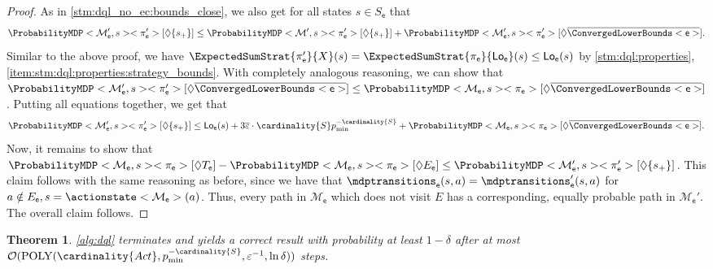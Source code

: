 \documentclass{article}
\newtheorem{theorem}{Theorem}\newtheorem{lemma}[theorem]{Lemma}\newtheorem{proposition}[theorem]{Proposition}\newtheorem{corollary}[theorem]{Corollary}\newtheorem{definition}[theorem]{Definition}\newtheorem{claim}[theorem]{Claim}\newtheorem{remark}[theorem]{Remark}\newtheorem{observation}[theorem]{Observation}\newtheorem{conjecture}[theorem]{Conjecture}\newtheorem{example}[theorem]{Example}
\newcommand{\MDP}{\mathcal{M}}
\newcommand{\States}{S}
\newcommand{\Actions}{Act}
\newcommand{\strategy}{\pi}
\newcommand{\reach}{\Diamond}
\newcommand{\lowerbound}{\mathsf{Lo}}
\newcommand{\targetstate}{s_+}
\newcommand{\targetset}{T}
\newcommand{\updatestep}{{\overline{\varepsilon}}}
\newcommand{\algoepisode}{\mathsf{e}}
\begin{document}
\begin{proof}
	As in \cref{stm:dql_no_ec:bounds_close}, we also get for all states $s \in \States_\algoepisode$ that
	\begin{equation*}
		\ProbabilityMDP<\MDP'_\algoepisode, s><\strategy'_\algoepisode>[\reach \{\targetstate\}] \leq \ProbabilityMDP<\MDP', s><\strategy'_\algoepisode>[\reach \{\targetstate\}] + \ProbabilityMDP<\MDP'_\algoepisode, s><\strategy'_\algoepisode>[\reach \overline{\ConvergedLowerBounds<\algoepisode>}].
	\end{equation*}
	Similar to the above proof, we have $\ExpectedSumStrat{\strategy'_\algoepisode}{X}(s) = \ExpectedSumStrat{\strategy_\algoepisode}{\lowerbound_\algoepisode}(s) \leq \lowerbound_\algoepisode(s)$ by \cref{stm:dql:properties}, \cref{item:stm:dql:properties:strategy_bounds}.
	With completely analogous reasoning, we can show that $\ProbabilityMDP<\MDP'_\algoepisode, s><\strategy'_\algoepisode>[\reach \overline{\ConvergedLowerBounds<\algoepisode>}] \leq \ProbabilityMDP<\MDP_\algoepisode, s><\strategy_\algoepisode>[\reach \overline{\ConvergedLowerBounds<\algoepisode>}]$.
	Putting all equations together, we get that
	\begin{equation*}
		\ProbabilityMDP<\MDP'_\algoepisode, s><\strategy'_\algoepisode>[\reach \{\targetstate\}] \leq \lowerbound_\algoepisode(s) + 3 \updatestep \cdot \cardinality{\States} p_{\min}^{-\cardinality{\States}} + \ProbabilityMDP<\MDP_\algoepisode, s><\strategy_\algoepisode>[\reach \overline{\ConvergedLowerBounds<\algoepisode>}].
	\end{equation*}
	Now, it remains to show that $\ProbabilityMDP<\MDP_\algoepisode, s><\strategy_\algoepisode>[\reach \targetset_\algoepisode] - \ProbabilityMDP<\MDP_\algoepisode, s><\strategy_\algoepisode>[\reach E_\algoepisode] \leq \ProbabilityMDP<\MDP'_\algoepisode, s><\strategy'_\algoepisode>[\reach \{\targetstate\}]$.
	This claim follows with the same reasoning as before, since we have that $\mdptransitions_\algoepisode(s, a) = \mdptransitions'_\algoepisode(s, a)$ for $a \notin E_\algoepisode, s = \actionstate<\MDP_\algoepisode>(a)$.
	Thus, every path in $\MDP_\algoepisode$ which does not visit $E$ has a corresponding, equally probable path in $\MDP_\algoepisode'$.
	The overall claim follows. 
\end{proof}

\begin{theorem} \label{stm:dql_correct}
	\cref{alg:dql} terminates and yields a correct result with probability at least $1 - \delta$ after at most $\mathcal{O}(\mathrm{POLY}(\cardinality{\Actions}, p_{\min}^{-\cardinality{\States}}, \varepsilon^{-1}, \ln \delta))$ steps.
\end{theorem}
\end{document}
